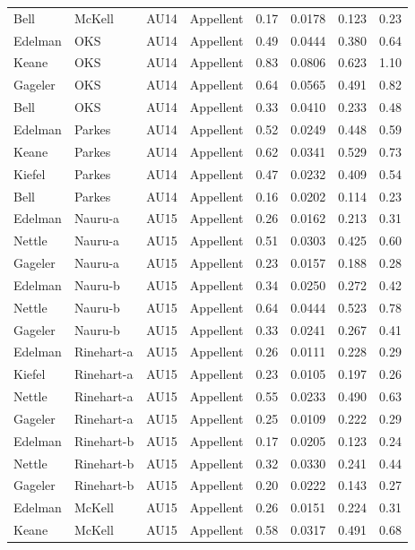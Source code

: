 \documentclass{monashthesis}
\begin{document}
\begin{center}
\begin{longtable}{llllllll}
Bell & McKell & AU14 & Appellent & 0.17 & 0.0178 & 0.123 & 0.23 \\
Edelman & OKS & AU14 & Appellent & 0.49 & 0.0444 & 0.380 & 0.64 \\
Keane & OKS & AU14 & Appellent & 0.83 & 0.0806 & 0.623 & 1.10 \\
Gageler & OKS & AU14 & Appellent & 0.64 & 0.0565 & 0.491 & 0.82 \\
Bell & OKS & AU14 & Appellent & 0.33 & 0.0410 & 0.233 & 0.48 \\
Edelman & Parkes & AU14 & Appellent & 0.52 & 0.0249 & 0.448 & 0.59 \\
Keane & Parkes & AU14 & Appellent & 0.62 & 0.0341 & 0.529 & 0.73 \\
Kiefel & Parkes & AU14 & Appellent & 0.47 & 0.0232 & 0.409 & 0.54 \\
Bell & Parkes & AU14 & Appellent & 0.16 & 0.0202 & 0.114 & 0.23 \\
Edelman & Nauru-a & AU15 & Appellent & 0.26 & 0.0162 & 0.213 & 0.31 \\
Nettle & Nauru-a & AU15 & Appellent & 0.51 & 0.0303 & 0.425 & 0.60 \\
Gageler & Nauru-a & AU15 & Appellent & 0.23 & 0.0157 & 0.188 & 0.28 \\
Edelman & Nauru-b & AU15 & Appellent & 0.34 & 0.0250 & 0.272 & 0.42 \\
Nettle & Nauru-b & AU15 & Appellent & 0.64 & 0.0444 & 0.523 & 0.78 \\
Gageler & Nauru-b & AU15 & Appellent & 0.33 & 0.0241 & 0.267 & 0.41 \\
Edelman & Rinehart-a & AU15 & Appellent & 0.26 & 0.0111 & 0.228 & 0.29 \\
Kiefel & Rinehart-a & AU15 & Appellent & 0.23 & 0.0105 & 0.197 & 0.26 \\
Nettle & Rinehart-a & AU15 & Appellent & 0.55 & 0.0233 & 0.490 & 0.63 \\
Gageler & Rinehart-a & AU15 & Appellent & 0.25 & 0.0109 & 0.222 & 0.29 \\
Edelman & Rinehart-b & AU15 & Appellent & 0.17 & 0.0205 & 0.123 & 0.24 \\
Nettle & Rinehart-b & AU15 & Appellent & 0.32 & 0.0330 & 0.241 & 0.44 \\
Gageler & Rinehart-b & AU15 & Appellent & 0.20 & 0.0222 & 0.143 & 0.27 \\
Edelman & McKell & AU15 & Appellent & 0.26 & 0.0151 & 0.224 & 0.31 \\
Keane & McKell & AU15 & Appellent & 0.58 & 0.0317 & 0.491 & 0.68 \\

\end{longtable}
\end{center}
\end{document}
